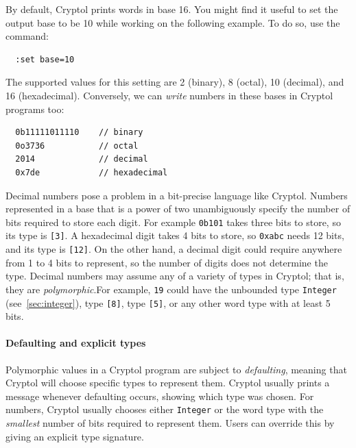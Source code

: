 By default, Cryptol prints words in base 16. You might find it useful
to set the output base to be 10 while working on the following
example. To do so, use the command:\indSettingBase
\begin{Verbatim}
  :set base=10
\end{Verbatim}
The supported values for this setting are 2 (binary), 8 (octal), 10
(decimal), and 16 (hexadecimal).  Conversely, we can \emph{write}
numbers in these bases in Cryptol programs too:
\begin{Verbatim}
  0b11111011110    // binary
  0o3736           // octal
  2014             // decimal
  0x7de            // hexadecimal
\end{Verbatim}

Decimal numbers pose a problem in a bit-precise language like Cryptol.
Numbers represented in a base that is a power of two unambiguously
specify the number of bits required to store each digit. For example
\texttt{0b101} takes three bits to store, so its type is \texttt{[3]}.
A hexadecimal digit takes 4 bits to store, so \texttt{0xabc} needs 12
bits, and its type is \texttt{[12]}. On the other hand, a decimal
digit could require anywhere from 1 to 4 bits to represent, so the
number of digits does not determine the type. Decimal numbers may
assume any of a variety of types in Cryptol; that is, they are
\emph{polymorphic}.\indPolymorphism For example, \texttt{19} could
have the unbounded type \texttt{Integer} (see~\autoref{sec:integer}),
type \texttt{[8]}, type \texttt{[5]}, or any other word type with at
least 5 bits.

\paragraph*{Defaulting and explicit types}\indDefaulting
Polymorphic values in a Cryptol program are subject to
\emph{defaulting}, meaning that Cryptol will choose specific types to
represent them. Cryptol usually prints a message whenever defaulting
occurs, showing which type was chosen. For numbers, Cryptol usually
chooses either \texttt{Integer} or the word type with the
\emph{smallest} number of bits required to represent them. Users can
override this by giving an explicit type signature.\indSignature


